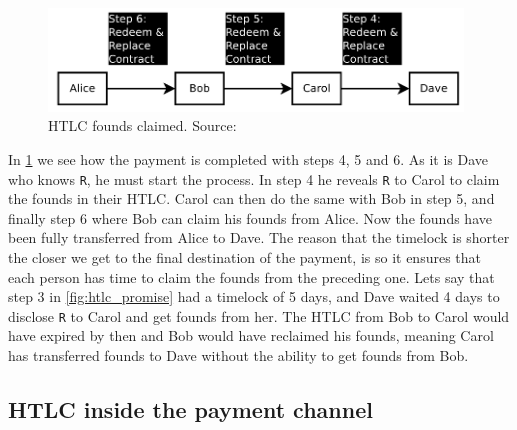 \begin{figure}[ht]
    \centering
    \includegraphics[width=11cm]{figures/htlc_settle.png}
    \caption{HTLC founds claimed. Source:~\cite{poon2015bitcoin}}
    \label{fig:htlc_settle}
\end{figure}

In \cref{fig:htlc_settle} we see how the payment is completed with steps 4, 5 and 6. As it is Dave who knows {\tt R}, he must start the process. In step 4 he reveals {\tt R} to Carol to claim the founds in their HTLC. Carol can then do the same with Bob in step 5, and finally step 6 where Bob can claim his founds from Alice.
Now the founds have been fully transferred from Alice to Dave.
The reason that the timelock is shorter the closer we get to the final destination of the payment, is so it ensures that each person has time to claim the founds from the preceding one. Lets say that step 3 in \cref{fig:htlc_promise} had a timelock of 5 days, and Dave waited 4 days to disclose {\tt R} to Carol and get founds from her. The HTLC from Bob to Carol would have expired by then and Bob would have reclaimed his founds, meaning Carol has transferred founds to Dave without the ability to get founds from Bob.



\subsection{HTLC inside the payment channel}
\label{subsec:htlcln}

